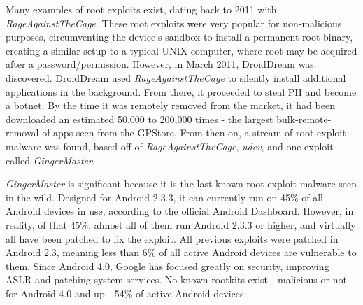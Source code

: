 Many examples of root exploits exist, dating back to 2011 with \textit{RageAgainstTheCage}\citep{droiddream}. These root exploits were very popular for non-malicious purposes, circumventing the device's sandbox to install a permanent root binary, creating a similar setup to a typical UNIX computer, where root may be acquired after a password/permission. However, in March 2011, DroidDream was discovered. DroidDream used \textit{RageAgainstTheCage} to silently install additional applications in the background. From there, it proceeded to steal PII and become a botnet. By the time it was remotely removed from the market, it had been downloaded an estimated 50,000 to 200,000 times\citep{castillo2010android} - the largest bulk-remote-removal of apps seen from the GPStore. From then on, a stream of root exploit malware was found, based off of \textit{RageAgainstTheCage}, \textit{udev}, and one exploit called \textit{GingerMaster}\citep{gingermaster}.

\textit{GingerMaster} is significant because it is the last known root exploit malware seen in the wild. Designed for Android 2.3.3, it can currently run on 45\% of all Android devices in use, according to the official Android Dashboard\citep{androiddashboard}. However, in reality, of that 45\%, almost all of them run Android 2.3.3 or higher, and virtually all have been patched to fix the exploit. All previous exploits were patched in Android 2.3, meaning less than 6\% of all active Android devices are vulnerable to them. Since Android 4.0, Google has focused greatly on security, improving ASLR and patching system services. No known rootkits exist - malicious or not - for Android 4.0 and up - 54\% of active Android devices.


